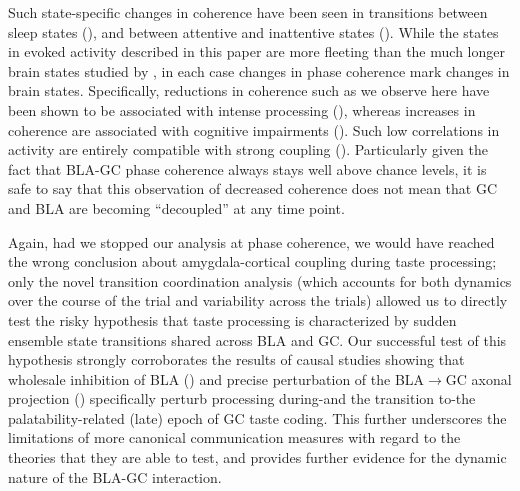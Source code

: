 \begin{refsection}
Such state-specific changes in coherence have been seen in transitions between sleep states (\cite{stitt2017a}), and between attentive and inattentive states (\cite{siegel2008a}). While the states in evoked activity described in this paper are more fleeting than the much longer brain states studied by \cite{stitt2017a,siegel2008a}, in each case changes in phase coherence mark changes in brain states. Specifically, reductions in coherence such as we observe here have been shown to be associated with intense processing (\cite{supp2011a}), whereas increases in coherence are associated with cognitive impairments (\cite{martinet2017a,arbab2018a}). Such low correlations in activity are entirely compatible with strong coupling (\cite{schneidman2006a}). Particularly given the fact that BLA-GC phase coherence always stays well above chance levels, it is safe to say that this observation of decreased coherence does not mean that GC and BLA are becoming “decoupled” at any time point. 

Again, had we stopped our analysis at phase coherence, we would have reached the wrong conclusion about amygdala-cortical coupling during taste processing; only the novel transition coordination analysis (which accounts for both dynamics over the course of the trial and variability across the trials) allowed us to directly test the risky hypothesis that taste processing is characterized by sudden ensemble state transitions shared across BLA and GC. Our successful test of this hypothesis strongly corroborates the results of causal studies showing that wholesale inhibition of BLA (\cite{piette2012a}) and precise perturbation of the BLA$\rightarrow$GC axonal projection (\cite{lin2021a}) specifically perturb processing during-and the transition to-the palatability-related (late) epoch of GC taste coding. This further underscores the limitations of more canonical communication measures with regard to the theories that they are able to test, and provides further evidence for the dynamic nature of the BLA-GC interaction.


\end{refsection}
